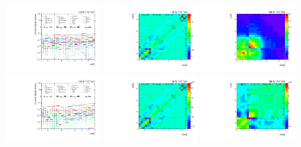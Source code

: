 \begin{refsection}
\begin{figure}[htb]
\begin{center}
\label{fig:b2k_mttbar}
\end{center}
\end{figure}
\clearpage
\begin{figure}[htb]
\begin{center}
 \includegraphics[width=0.32\textwidth]{fig_fullRun2UL/unfolding/combined/deltaSystCombinedlog_rebinnedB_b2k_mttbar.pdf}
 \includegraphics[width=0.32\textwidth]{fig_fullRun2UL/unfolding/combined/StatCovMatrix_rebinnedB_b2k_mttbar.pdf}
 \includegraphics[width=0.32\textwidth]{fig_fullRun2UL/unfolding/combined/TotalSystCovMatrix_rebinnedB_b2k_mttbar.pdf} \\
 \includegraphics[width=0.32\textwidth]{fig_fullRun2UL/unfolding/combined/deltaSystCombinedlogNorm_rebinnedB_b2k_mttbar.pdf}
 \includegraphics[width=0.32\textwidth]{fig_fullRun2UL/unfolding/combined/StatCovMatrixNorm_rebinnedB_b2k_mttbar.pdf}
 \includegraphics[width=0.32\textwidth]{fig_fullRun2UL/unfolding/combined/TotalSystCovMatrixNorm_rebinnedB_b2k_mttbar.pdf} \\

\end{center}
\end{figure}
\end{refsection}
